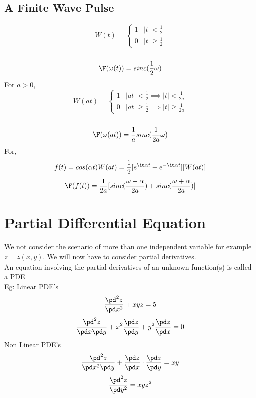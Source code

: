 \documentclass[11pt]{article}
\theoremstyle{definition}
\begin{document}
\subsection{A Finite Wave Pulse}
\[W(t) =  \begin{cases}
      1 & |t| < \frac{1}{2} \\
      0 & |t| \geq \frac{1}{2}
   \end{cases}
\]\\
$$\F(\omega(t)) = sinc(\frac{1}{2}\omega)$$
\clearpage
For $a > 0$,
\[W(at) =  \begin{cases}
      1 & |at| < \frac{1}{2} \implies |t| < \frac{1}{2a}\\
      0 & |at| \geq \frac{1}{2} \implies |t| \geq \frac{1}{2a}
   \end{cases}
\]\\
$$\F(\omega(at)) = \frac{1}{a}sinc(\frac{1}{2a}\omega)$$
For,
$$f(t) = cos(\alpha t) W(at) = \frac{1}{2}[e^{\iu \alpha t} + e^{-\iu \alpha t}][W(at)]$$
$$\F(f(t)) = \frac{1}{2a}[sinc(\frac{\omega - \alpha}{2a}) + sinc(\frac{\omega + \alpha}{2a})]$$
\newpage

\section{Partial Differential Equation}
We not consider the scenario of more than one independent variable for example $z = z(x, y)$. We will now have to consider partial derivatives.\\
An equation involving the partial derivatives of an unknown function(s) is called a PDE\\
Eg:
Linear PDE's
$$\frac{\pd^2z}{\pd x^2} + xyz = 5$$
$$\frac{\pd^2z}{\pd x \pd y} + x^2\frac{\pd z}{\pd y} + y^2 \frac{\pd z}{\pd x} = 0$$
Non Linear PDE's
$$\frac{\pd^2 z}{\pd x^2 \pd y} + \frac{\pd z}{\pd x} \cdot \frac{\pd z}{\pd y} = xy$$
$$\frac{\pd^2 z}{\pd y^2} = xyz^2$$
\end{document}
